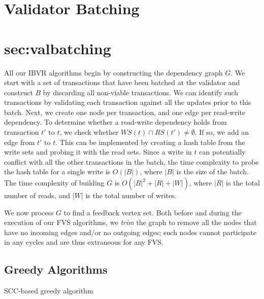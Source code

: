 
\section{Validator Batching}
\section{sec:valbatching}
All our IBVR algorithms begin by constructing the dependency graph $G$. We start with a set of transactions that have been batched at the validator and construct $B$ by discarding all non-viable transactions. We can identify such transactions by validating each transaction against all the updates prior to this batch.
Next, we create one node per transaction, and one edge per read-write dependency. To determine whether a read-write dependency holds from transaction $t'$ to $t$, we check whether $WS(t) \cap RS(t') \neq \emptyset$. If so, we add an edge from $t'$ to $t$. This can be implemented by creating a hash table from the write sets and probing it with the read sets. Since a write in $t$ can potentially conflict with all the other transactions in the batch, the time complexity to probe the hash table for a single write is $O(|B|)$, where $|B|$ is the size of the batch. The time complexity of building $G$ is $O(|B|^2+|R|+|W|)$, where $|R|$ is the total number of reads, and $|W|$ is the total number of writes. 

We now process $G$ to find a feedback vertex set. Both before and during the
execution of our FVS algorithms, we \emph{trim} the graph to remove all the nodes
that have no incoming edges and/or no outgoing edges; such nodes cannot
participate in any cycles and are thus extraneous for any FVS.

\subsection{Greedy Algorithms}

\begin{algorithm}[t]
	\SetAlgoLined\DontPrintSemicolon
	
	
	\caption{SCC-based greedy algorithm}
	\label{alg:scc}
\end{algorithm}


